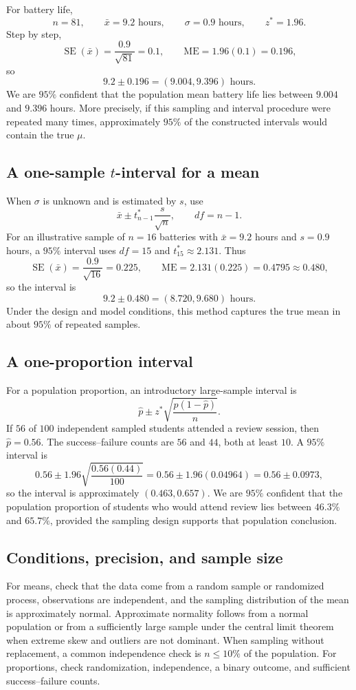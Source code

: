 \documentclass[11pt]{article}
\newcommand{\SE}{\operatorname{SE}}
\begin{document}
For battery life,
\[
n=81,\qquad \bar{x}=9.2\text{ hours},\qquad
\sigma=0.9\text{ hours},\qquad z^*=1.96.
\]
Step by step,
\[
\SE(\bar{x})=\frac{0.9}{\sqrt{81}}=0.1,
\qquad \mathrm{ME}=1.96(0.1)=0.196,
\]
so
\[
9.2\pm0.196=(9.004,9.396)\text{ hours}.
\]
We are $95\%$ confident that the population mean battery life lies between
$9.004$ and $9.396$ hours.  More precisely, if this sampling and interval
procedure were repeated many times, approximately $95\%$ of the constructed
intervals would contain the true $\mu$.

\subsection{A one-sample \texorpdfstring{$t$}{t}-interval for a mean}
When $\sigma$ is unknown and is estimated by $s$, use
\begin{equation}\label{eq:tinterval}
\bar{x}\pm t^*_{n-1}\frac{s}{\sqrt n},
\qquad df=n-1.
\end{equation}
For an illustrative sample of $n=16$ batteries with $\bar{x}=9.2$ hours and
$s=0.9$ hours, a $95\%$ interval uses $df=15$ and
$t^*_{15}\approx2.131$.  Thus
\[
\SE(\bar{x})=\frac{0.9}{\sqrt{16}}=0.225,
\qquad \mathrm{ME}=2.131(0.225)=0.4795\approx0.480,
\]
so the interval is
\[
9.2\pm0.480=(8.720,9.680)\text{ hours}.
\]
Under the design and model conditions, this method captures the true mean in
about $95\%$ of repeated samples.

\subsection{A one-proportion interval}
For a population proportion, an introductory large-sample interval is
\begin{equation}\label{eq:prop-interval}
\widehat p\pm z^*\sqrt{\frac{\widehat p(1-\widehat p)}{n}}.
\end{equation}
If $56$ of $100$ independent sampled students attended a review session, then
$\widehat p=0.56$.  The success--failure counts are $56$ and $44$, both at
least $10$.  A $95\%$ interval is
\[
0.56\pm1.96\sqrt{\frac{0.56(0.44)}{100}}
=0.56\pm1.96(0.04964)=0.56\pm0.0973,
\]
so the interval is approximately $(0.463,0.657)$.  We are $95\%$ confident
that the population proportion of students who would attend review lies
between $46.3\%$ and $65.7\%$, provided the sampling design supports that
population conclusion.

\subsection{Conditions, precision, and sample size}
For means, check that the data come from a random sample or randomized
process, observations are independent, and the sampling distribution of the
mean is approximately normal.  Approximate normality follows from a normal
population or from a sufficiently large sample under the central limit
theorem when extreme skew and outliers are not dominant.  When sampling
without replacement, a common independence check is $n\le10\%$ of the
population.  For proportions, check randomization, independence, a binary
outcome, and sufficient success--failure counts.
\end{document}
